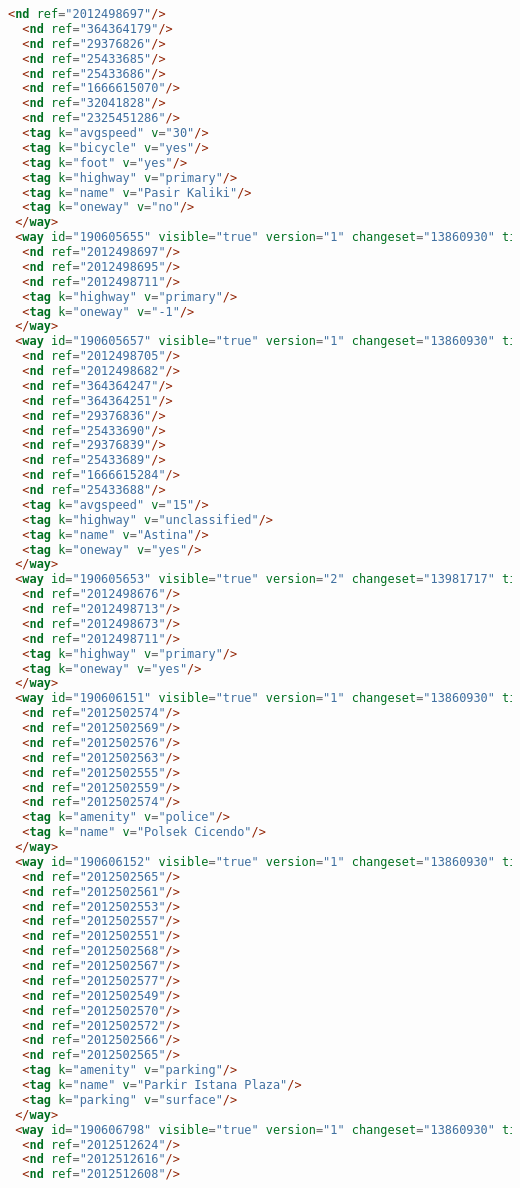 \begin{lstlisting}[language=HTML,basicstyle=\tiny,caption=test.xml]
  <nd ref="2012498697"/>
  <nd ref="364364179"/>
  <nd ref="29376826"/>
  <nd ref="25433685"/>
  <nd ref="25433686"/>
  <nd ref="1666615070"/>
  <nd ref="32041828"/>
  <nd ref="2325451286"/>
  <tag k="avgspeed" v="30"/>
  <tag k="bicycle" v="yes"/>
  <tag k="foot" v="yes"/>
  <tag k="highway" v="primary"/>
  <tag k="name" v="Pasir Kaliki"/>
  <tag k="oneway" v="no"/>
 </way>
 <way id="190605655" visible="true" version="1" changeset="13860930" timestamp="2012-11-13T15:42:42Z" user="yudiwbs" uid="268765">
  <nd ref="2012498697"/>
  <nd ref="2012498695"/>
  <nd ref="2012498711"/>
  <tag k="highway" v="primary"/>
  <tag k="oneway" v="-1"/>
 </way>
 <way id="190605657" visible="true" version="1" changeset="13860930" timestamp="2012-11-13T15:42:42Z" user="yudiwbs" uid="268765">
  <nd ref="2012498705"/>
  <nd ref="2012498682"/>
  <nd ref="364364247"/>
  <nd ref="364364251"/>
  <nd ref="29376836"/>
  <nd ref="25433690"/>
  <nd ref="29376839"/>
  <nd ref="25433689"/>
  <nd ref="1666615284"/>
  <nd ref="25433688"/>
  <tag k="avgspeed" v="15"/>
  <tag k="highway" v="unclassified"/>
  <tag k="name" v="Astina"/>
  <tag k="oneway" v="yes"/>
 </way>
 <way id="190605653" visible="true" version="2" changeset="13981717" timestamp="2012-11-22T06:24:04Z" user="yudiwbs" uid="268765">
  <nd ref="2012498676"/>
  <nd ref="2012498713"/>
  <nd ref="2012498673"/>
  <nd ref="2012498711"/>
  <tag k="highway" v="primary"/>
  <tag k="oneway" v="yes"/>
 </way>
 <way id="190606151" visible="true" version="1" changeset="13860930" timestamp="2012-11-13T15:47:31Z" user="yudiwbs" uid="268765">
  <nd ref="2012502574"/>
  <nd ref="2012502569"/>
  <nd ref="2012502576"/>
  <nd ref="2012502563"/>
  <nd ref="2012502555"/>
  <nd ref="2012502559"/>
  <nd ref="2012502574"/>
  <tag k="amenity" v="police"/>
  <tag k="name" v="Polsek Cicendo"/>
 </way>
 <way id="190606152" visible="true" version="1" changeset="13860930" timestamp="2012-11-13T15:47:31Z" user="yudiwbs" uid="268765">
  <nd ref="2012502565"/>
  <nd ref="2012502561"/>
  <nd ref="2012502553"/>
  <nd ref="2012502557"/>
  <nd ref="2012502551"/>
  <nd ref="2012502568"/>
  <nd ref="2012502567"/>
  <nd ref="2012502577"/>
  <nd ref="2012502549"/>
  <nd ref="2012502570"/>
  <nd ref="2012502572"/>
  <nd ref="2012502566"/>
  <nd ref="2012502565"/>
  <tag k="amenity" v="parking"/>
  <tag k="name" v="Parkir Istana Plaza"/>
  <tag k="parking" v="surface"/>
 </way>
 <way id="190606798" visible="true" version="1" changeset="13860930" timestamp="2012-11-13T15:51:18Z" user="yudiwbs" uid="268765">
  <nd ref="2012512624"/>
  <nd ref="2012512616"/>
  <nd ref="2012512608"/>

\end{lstlisting}

